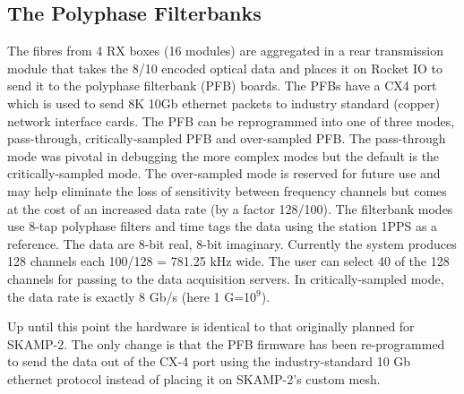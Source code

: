 \subsection{The Polyphase Filterbanks}
The fibres from 4 RX boxes (16 modules) are aggregated in a rear transmission module that takes the 8/10 encoded optical data and places it on Rocket IO to send it to the polyphase filterbank (PFB) boards. The PFBs have a CX4 port which is used to send 8K 10Gb ethernet packets to industry standard (copper) network interface cards. The PFB can be reprogrammed into one of three modes, pass-through, critically-sampled PFB and over-sampled PFB. The pass-through mode was pivotal in debugging the more complex modes but the default is the critically-sampled mode. The over-sampled mode is reserved for future use and may help eliminate the loss of sensitivity between frequency channels but comes at the cost of an increased data rate (by a factor 128/100). The filterbank modes use 8-tap polyphase filters and time tags the data using the station 1PPS as a reference. The data are 8-bit real, 8-bit imaginary. Currently the system produces 128 channels each 100/128 = 781.25 kHz wide. The user can select 40 of the 128 channels for passing to the data acquisition servers. In critically-sampled mode, the data rate is exactly 8 Gb/s (here 1 G=10$^9$).

Up until this point the hardware is identical to that originally planned for SKAMP-2. The only change is that the PFB firmware has been re-programmed to send the data out of the CX-4 port using the industry-standard 10 Gb ethernet protocol instead of placing it on SKAMP-2's custom mesh.

